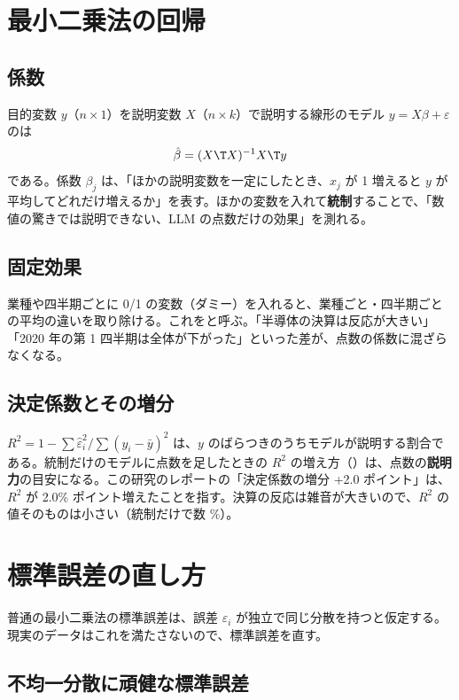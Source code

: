 \section{最小二乗法の回帰}

\subsection{係数}

目的変数 $y$（$n\times1$）を説明変数 $X$（$n\times k$）で説明する線形のモデル $y = X\beta + \varepsilon$ のは
\begin{equation}
\hat\beta = (X\T X)^{-1}X\T y
\end{equation}
である。係数 $\beta_j$ は、「ほかの説明変数を一定にしたとき、$x_j$ が 1 増えると $y$ が平均してどれだけ増えるか」を表す。ほかの変数を入れて\textbf{統制}することで、「数値の驚きでは説明できない、LLM の点数だけの効果」を測れる。

\subsection{固定効果}

業種や四半期ごとに 0/1 の変数（ダミー）を入れると、業種ごと・四半期ごとの平均の違いを取り除ける。これをと呼ぶ。「半導体の決算は反応が大きい」「2020 年の第 1 四半期は全体が下がった」といった差が、点数の係数に混ざらなくなる。

\subsection{決定係数とその増分}

 $R^2 = 1 - \sum\hat\varepsilon_i^2/\sum(y_i-\bar y)^2$ は、$y$ のばらつきのうちモデルが説明する割合である。統制だけのモデルに点数を足したときの $R^2$ の増え方（）は、点数の\textbf{説明力}の目安になる。この研究のレポートの「決定係数の増分 +2.0 ポイント」は、$R^2$ が 2.0\% ポイント増えたことを指す。決算の反応は雑音が大きいので、$R^2$ の値そのものは小さい（統制だけで数 \%）。

\section{標準誤差の直し方}

普通の最小二乗法の標準誤差は、誤差 $\varepsilon_i$ が独立で同じ分散を持つと仮定する。現実のデータはこれを満たさないので、標準誤差を直す。

\subsection{不均一分散に頑健な標準誤差}


